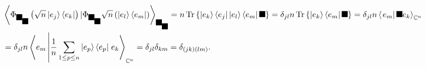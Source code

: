 \documentclass[aps,preprint]{revtex4}%
\providecommand{\U}[1]{\protect\rule{.1in}{.1in}}
\begin{document}
\begin{align}
&  \left\langle \Phi_{\U{3c9} _{\U{3c1} }}\left(  \sqrt{n}\left\vert
e_{j}\right\rangle \left\langle e_{k}\right\vert \right)  |\Phi_{\U{3c9}
_{\U{3c1} }}\sqrt{n}\left(  \left\vert e_{l}\right\rangle \left\langle
e_{m}\right\vert \right)  \right\rangle _{\U{3c9} _{\U{3c1} }}%
=n\operatorname{Tr}\left\{  \left\vert e_{k}\right\rangle \left\langle
e_{j}\right\vert \left\vert e_{l}\right\rangle \left\langle e_{m}\right\vert
\U{3c1} \right\}  =\delta_{jl}n\operatorname{Tr}\left\{  \left\vert
e_{k}\right\rangle \left\langle e_{m}\right\vert \U{3c1} \right\}
=\delta_{jl}n\left\langle \left.  e_{m}\right\vert \U{3c1} e_{k}\right\rangle
_{\mathbb{C}^{n}}\\
&  =\delta_{jl}n\left\langle e_{m}\left\vert \frac{1}{n}\sum_{1\leq p\leq
n}\left\vert e_{p}\right\rangle \left\langle e_{p}\right\vert \right.
e_{k}\right\rangle _{\mathbb{C}^{n}}=\delta_{jl}\delta_{km}=\delta_{\left(
jk\right)  \left(  lm\right)  }.
\end{align}
\end{document}
